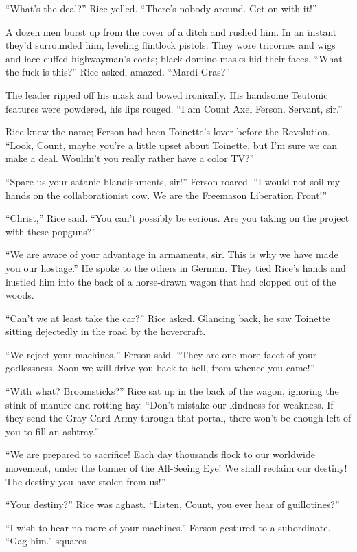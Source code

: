 “What’s the deal?” Rice yelled. “There’s nobody around. Get on with it!”

A dozen men burst up from the cover of a ditch and rushed him. In an instant they’d surrounded him, leveling flintlock pistols. They wore tricornes and wigs and lace-cuffed highwayman’s coats; black domino masks hid their faces. “What the fuck is this?” Rice asked, amazed. “Mardi Gras?”

The leader ripped off his mask and bowed ironically. His handsome Teutonic features were powdered, his lips rouged. “I am Count Axel Ferson. Servant, sir.”

Rice knew the name; Ferson had been Toinette’s lover before the Revolution. “Look, Count, maybe you’re a little upset about Toinette, but I’m sure we can make a deal. Wouldn’t you really rather have a color TV?”

“Spare us your satanic blandishments, sir!” Ferson roared. “I would not soil my hands on the collaborationist cow. We are the Freemason Liberation Front!”

“Christ,” Rice said. “You can’t possibly be serious. Are you taking on the project with these popguns?”

“We are aware of your advantage in armaments, sir. This is why we have made you our hostage.” He spoke to the others in German. They tied Rice’s hands and hustled him into the back of a horse-drawn wagon that had clopped out of the woods.

“Can’t we at least take the car?” Rice asked. Glancing back, he saw Toinette sitting dejectedly in the road by the hovercraft.

“We reject your machines,” Ferson said. “They are one more facet of your godlessness. Soon we will drive you back to hell, from whence you came!”

“With what? Broomsticks?” Rice sat up in the back of the wagon, ignoring the stink of manure and rotting hay. “Don’t mistake our kindness for weakness. If they send the Gray Card Army through that portal, there won’t be enough left of you to fill an ashtray.”

“We are prepared to sacrifice! Each day thousands flock to our worldwide movement, under the banner of the All-Seeing Eye! We shall reclaim our destiny! The destiny you have stolen from us!”

“Your destiny?” Rice was aghast. “Listen, Count, you ever hear of guillotines?”

“I wish to hear no more of your machines.” Ferson gestured to a subordinate. “Gag him.”
squares

